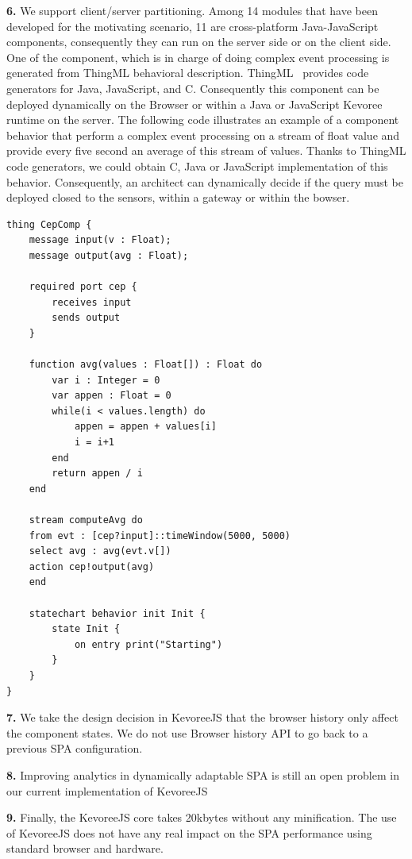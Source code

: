 \indent \textbf{6.} We support client/server partitioning. Among 14 modules that have been developed for the motivating scenario, 11 are cross-platform Java-JavaScript components, consequently they can run on the server side or on the client side.  One of the component, which is in charge of doing complex event processing is generated from ThingML behavioral description. ThingML~\cite{DBLP:conf/models/FleureyMSB11} provides code generators for Java, JavaScript, and C. Consequently this component can be deployed dynamically on the Browser or within a Java or JavaScript Kevoree runtime on the server.  The following code illustrates an example of a component behavior that perform a complex event processing on a stream of float value and provide every five second an average of this stream of values. Thanks to ThingML code generators, we could obtain C, Java or JavaScript implementation of this behavior. Consequently, an architect can dynamically decide if the query must be deployed closed to the sensors, within a gateway or within the bowser. 

\begin{lstlisting}[language=ThingML,frame=none,caption={Excerpt of a component implementation defined using ThingML}]
thing CepComp {
	message input(v : Float);
	message output(avg : Float);
	
	required port cep {
		receives input
		sends output	
	}
	
	function avg(values : Float[]) : Float do
		var i : Integer = 0
		var appen : Float = 0
		while(i < values.length) do
			appen = appen + values[i]
			i = i+1
		end
		return appen / i
	end
	
	stream computeAvg do
	from evt : [cep?input]::timeWindow(5000, 5000)
	select avg : avg(evt.v[])
	action cep!output(avg)
	end
	
	statechart behavior init Init {
		state Init {
			on entry print("Starting")			
		}
	}
}
\end{lstlisting}



\indent \textbf{7.} We take the design decision in KevoreeJS that the browser history only affect the component states. We do not use Browser history API to go back to a previous SPA configuration.

\indent \textbf{8.} Improving analytics in dynamically adaptable SPA is still an open problem in our current implementation of KevoreeJS

\indent \textbf{9.} Finally, the KevoreeJS core takes 20kbytes without any minification. The use of KevoreeJS does not have any real impact on the SPA performance using standard browser and hardware.
